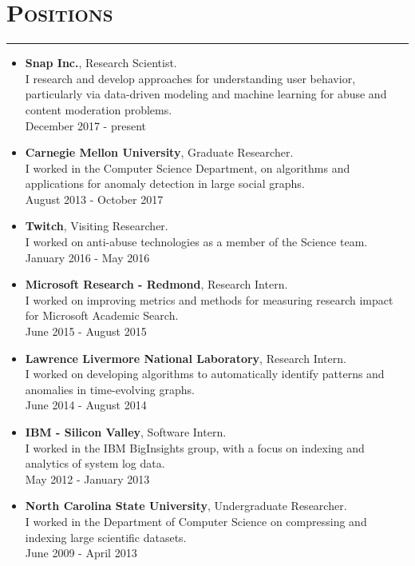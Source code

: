 \documentclass{article}
\newcommand{\HRule}{\rule{\linewidth}{0.5mm}}
\begin{document}
\section*{\bf \textsc{Positions}}
\vspace{-5mm}\HRule
\begin{itemize}
\item {\bf Snap Inc.}, Research Scientist. \\ I research and develop approaches for understanding user behavior, particularly via data-driven modeling and machine learning for abuse and content moderation problems. \\ December 2017 - present
\item {\bf Carnegie Mellon University}, Graduate Researcher. \\ I worked in the Computer Science Department, on algorithms and applications for anomaly detection in large social graphs. \\ August 2013 - October 2017
\item {\bf Twitch}, Visiting Researcher. \\  I worked on anti-abuse technologies as a member of the Science team.  \\ January 2016 - May 2016
\item {\bf Microsoft Research - Redmond}, Research Intern. \\  I worked on improving metrics and methods for measuring research impact for Microsoft Academic Search.  \\ June 2015 - August 2015
\item {\bf Lawrence Livermore National Laboratory}, Research Intern. \\  I worked on developing algorithms to automatically identify patterns and anomalies in time-evolving graphs. \\ June 2014 - August 2014
\item {\bf IBM - Silicon Valley}, Software Intern. \\ I worked in the IBM BigInsights group, with a focus on indexing and analytics of system log data.  \\ May 2012 - January 2013
\item {\bf North Carolina State University}, Undergraduate Researcher. \\ I worked in the Department of Computer Science on compressing and indexing large scientific datasets. \\ June 2009 - April 2013
\end{itemize}
\end{document}
